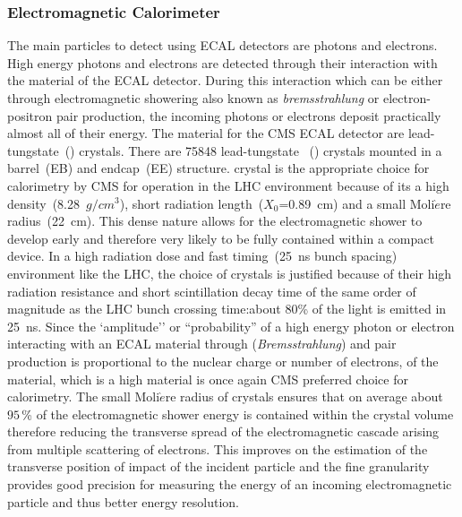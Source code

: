 \subsubsection{Electromagnetic Calorimeter}
 The main particles to detect using ECAL detectors are photons and electrons. High energy photons and electrons are detected through their interaction with the material of the ECAL detector. During this interaction which can be either through electromagnetic showering also known as \textit{bremsstrahlung} or electron-positron pair production, the incoming photons or electrons deposit practically almost all of their energy. The material for the CMS ECAL detector are lead-tungstate~(\pb) crystals. There are 75848 lead-tungstate ~(\pb) crystals mounted in a barrel~(\textsc{EB}) and endcap~(\textsc{EE}) structure.   
\pb crystal is the appropriate choice for calorimetry by CMS for operation in the LHC environment because of its a high density~(8.28~$g/cm^{3}$), short radiation length~($X_{0}$=0.89~cm) and a small Moli$\grave{e}$re radius~(22~cm). This dense nature allows for the electromagnetic shower to develop early and therefore very likely to be fully contained within a compact device.  In a high radiation dose and fast timing~(25~ns bunch spacing) environment like the LHC, the choice of \pb crystals is justified because of their high radiation resistance and short scintillation decay time of the same order of magnitude as the LHC bunch crossing time:about 80\% of the light is emitted in 25~ns.
Since the `amplitude'' or ``probability'' of a high energy photon or electron interacting with an ECAL material through (\emph{Bremsstrahlung}) and pair production is proportional to the nuclear charge or number of electrons,  of the material, \pb which is a high  material is once again CMS preferred choice for calorimetry. The small Moli$\grave{e}$re radius of \pb crystals ensures that on average about $95$\,\% of the electromagnetic shower energy is contained within the crystal volume therefore reducing the transverse spread of the electromagnetic cascade arising from multiple scattering of electrons. This improves on the estimation of the transverse position of impact of the incident particle and the fine granularity provides good precision for measuring the energy of an incoming electromagnetic particle and thus better energy resolution. 
 
